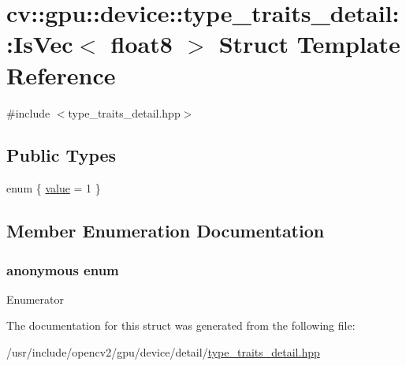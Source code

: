 \hypertarget{structcv_1_1gpu_1_1device_1_1type__traits__detail_1_1IsVec_3_01float8_01_4}{\section{cv\-:\-:gpu\-:\-:device\-:\-:type\-\_\-traits\-\_\-detail\-:\-:Is\-Vec$<$ float8 $>$ Struct Template Reference}
\label{structcv_1_1gpu_1_1device_1_1type__traits__detail_1_1IsVec_3_01float8_01_4}
}


{\ttfamily \#include $<$type\-\_\-traits\-\_\-detail.\-hpp$>$}

\subsection*{Public Types}
\begin{DoxyCompactItemize}
\item 
enum \{ \hyperlink{structcv_1_1gpu_1_1device_1_1type__traits__detail_1_1IsVec_3_01float8_01_4_a63ec4bf8812e45c66163e9a5bf9d9f63ab54407364f77fa1907791a09578b64b7}{value} = 1
 \}
\end{DoxyCompactItemize}


\subsection{Member Enumeration Documentation}
\hypertarget{structcv_1_1gpu_1_1device_1_1type__traits__detail_1_1IsVec_3_01float8_01_4_a63ec4bf8812e45c66163e9a5bf9d9f63}{\subsubsection[{anonymous enum}]{\setlength{\rightskip}{0pt plus 5cm}anonymous enum}}\label{structcv_1_1gpu_1_1device_1_1type__traits__detail_1_1IsVec_3_01float8_01_4_a63ec4bf8812e45c66163e9a5bf9d9f63}
\begin{Desc}
\item[Enumerator]\par
\begin{description}
\item[{\em 
\hypertarget{structcv_1_1gpu_1_1device_1_1type__traits__detail_1_1IsVec_3_01float8_01_4_a63ec4bf8812e45c66163e9a5bf9d9f63ab54407364f77fa1907791a09578b64b7}{value}\label{structcv_1_1gpu_1_1device_1_1type__traits__detail_1_1IsVec_3_01float8_01_4_a63ec4bf8812e45c66163e9a5bf9d9f63ab54407364f77fa1907791a09578b64b7}
}]\end{description}
\end{Desc}


The documentation for this struct was generated from the following file\-:\begin{DoxyCompactItemize}
\item 
/usr/include/opencv2/gpu/device/detail/\hyperlink{type__traits__detail_8hpp}{type\-\_\-traits\-\_\-detail.\-hpp}\end{DoxyCompactItemize}
